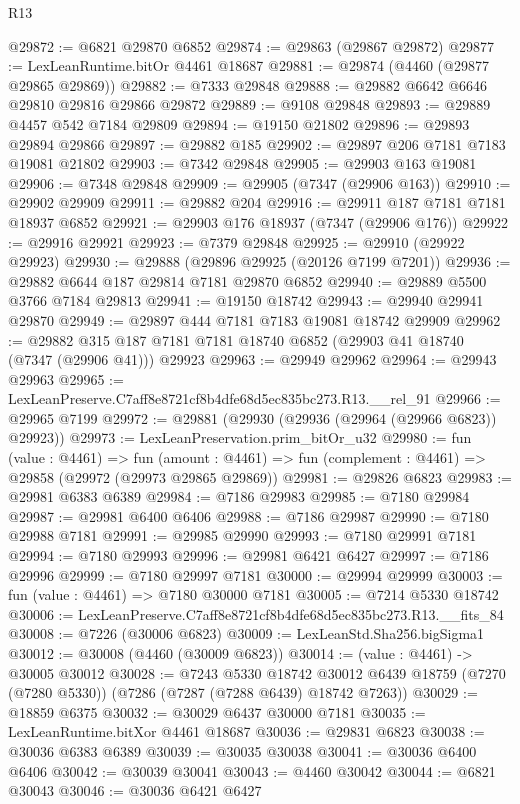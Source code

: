 \begin{lexlean}{R13}
\begin{coremodule}
@29872 := @6821 @29870 @6852
@29874 := @29863 (@29867 @29872)
@29877 := LexLeanRuntime.bitOr @4461 @18687
@29881 := @29874 (@4460 (@29877 @29865 @29869))
@29882 := @7333 @29848
@29888 := @29882 @6642 @6646 @29810 @29816 @29866 @29872
@29889 := @9108 @29848
@29893 := @29889 @4457 @542 @7184 @29809
@29894 := @19150 @21802
@29896 := @29893 @29894 @29866
@29897 := @29882 @185
@29902 := @29897 @206 @7181 @7183 @19081 @21802
@29903 := @7342 @29848
@29905 := @29903 @163 @19081
@29906 := @7348 @29848
@29909 := @29905 (@7347 (@29906 @163))
@29910 := @29902 @29909
@29911 := @29882 @204
@29916 := @29911 @187 @7181 @7181 @18937 @6852
@29921 := @29903 @176 @18937 (@7347 (@29906 @176))
@29922 := @29916 @29921
@29923 := @7379 @29848
@29925 := @29910 (@29922 @29923)
@29930 := @29888 (@29896 @29925 (@20126 @7199 @7201))
@29936 := @29882 @6644 @187 @29814 @7181 @29870 @6852
@29940 := @29889 @5500 @3766 @7184 @29813
@29941 := @19150 @18742
@29943 := @29940 @29941 @29870
@29949 := @29897 @444 @7181 @7183 @19081 @18742 @29909
@29962 := @29882 @315 @187 @7181 @7181 @18740 @6852 (@29903 @41 @18740 (@7347 (@29906 @41))) @29923
@29963 := @29949 @29962
@29964 := @29943 @29963
@29965 := LexLeanPreserve.C7aff8e8721cf8b4dfe68d5ec835bc273.R13.__rel_91
@29966 := @29965 @7199
@29972 := @29881 (@29930 (@29936 (@29964 (@29966 @6823)) @29923))
@29973 := LexLeanPreservation.prim_bitOr_u32
@29980 := fun (value : @4461) =>
  fun (amount : @4461) => fun (complement : @4461) => @29858 (@29972 (@29973 @29865 @29869))
@29981 := @29826 @6823
@29983 := @29981 @6383 @6389
@29984 := @7186 @29983
@29985 := @7180 @29984
@29987 := @29981 @6400 @6406
@29988 := @7186 @29987
@29990 := @7180 @29988 @7181
@29991 := @29985 @29990
@29993 := @7180 @29991 @7181
@29994 := @7180 @29993
@29996 := @29981 @6421 @6427
@29997 := @7186 @29996
@29999 := @7180 @29997 @7181
@30000 := @29994 @29999
@30003 := fun (value : @4461) => @7180 @30000 @7181
@30005 := @7214 @5330 @18742
@30006 := LexLeanPreserve.C7aff8e8721cf8b4dfe68d5ec835bc273.R13.__fits_84
@30008 := @7226 (@30006 @6823)
@30009 := LexLeanStd.Sha256.bigSigma1
@30012 := @30008 (@4460 (@30009 @6823))
@30014 := (value : @4461) -> @30005 @30012
@30028 := @7243
    @5330
    @18742
    @30012
    @6439
    @18759
    (@7270 (@7280 @5330))
    (@7286 (@7287 (@7288 @6439) @18742 @7263))
@30029 := @18859 @6375
@30032 := @30029 @6437 @30000 @7181
@30035 := LexLeanRuntime.bitXor @4461 @18687
@30036 := @29831 @6823
@30038 := @30036 @6383 @6389
@30039 := @30035 @30038
@30041 := @30036 @6400 @6406
@30042 := @30039 @30041
@30043 := @4460 @30042
@30044 := @6821 @30043
@30046 := @30036 @6421 @6427

\end{coremodule}
\end{lexlean}

